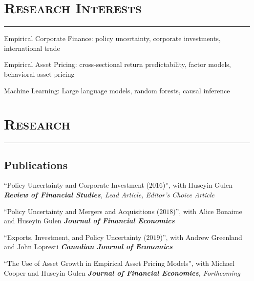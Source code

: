 \documentclass[10pt,letterpaper]{article}
\renewenvironment{itemize}{
  \begin{list}{}{
    \setlength{\leftmargin}{1.5em}
    \setlength{\itemsep}{0.25em}
    \setlength{\parskip}{0pt}
    \setlength{\parsep}{0.25em}
  }
}{
  \end{list}
}
\begin{document}
\section*{\textsc{Research Interests}}
\nointerlineskip
\vspace{-3mm}
\rule{\textwidth}{0.5mm}

\begin{itemize}
  \item Empirical Corporate Finance: policy uncertainty, corporate investments, international trade
  \item Empirical Asset Pricing: cross-sectional return predictability, factor models, behavioral asset pricing
  \item Machine Learning: Large language models, random forests, causal inference
\end{itemize}












\section*{\textsc{Research}}
\nointerlineskip
\vspace{-3mm}
\rule{\textwidth}{0.5mm}

\subsection*{Publications}
\begin{itemize}

\item ``Policy Uncertainty and Corporate Investment ($2016$)'', with Huseyin Gulen
\subitem \emph{\textbf{Review of Financial Studies}, Lead Article, Editor's Choice Article}
\medskip
\item ``Policy Uncertainty and Mergers and Acquisitions ($2018$)'', with Alice Bonaime and Huseyin Gulen
\subitem \emph{\textbf{Journal of Financial Economics}}
\medskip
\item ``Exports, Investment, and Policy Uncertainty ($2019$)'', with Andrew Greenland and John Lopresti
\subitem \emph{\textbf{Canadian Journal of Economics}}
\medskip
\item ``The Use of Asset Growth in Empirical Asset Pricing Models'', with Michael Cooper and Huseyin Gulen 
  \subitem \emph{\textbf{Journal of Financial Economics}, Forthcoming}
\end{itemize}
\end{document}

